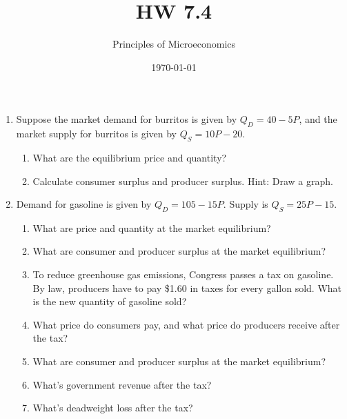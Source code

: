 \documentclass{article}
\title{HW 7.4}
\author{Principles of Microeconomics}
\date{\today}
\begin{document}
\maketitle

\begin{enumerate}

\item Suppose the market demand for burritos is given by $Q_D = 40 - 5P$, and the market supply for burritos is given by $Q_S = 10P - 20$.

	\begin{enumerate}
	
	\item What are the equilibrium price and quantity?
	
	\item Calculate consumer surplus and producer surplus. Hint: Draw a graph.
	
	\end{enumerate}
	
\item Demand for gasoline is given by $Q_D = 105 - 15P$. Supply is $Q_S = 25P - 15$. 

	\begin{enumerate}
	
	\item What are price and quantity at the market equilibrium?
	
	\item What are consumer and producer surplus at the market equilibrium?
	
	\item To reduce greenhouse gas emissions, Congress passes a tax on gasoline. By law, producers have to pay \$1.60 in taxes for every gallon sold. What is the new quantity of gasoline sold?
	
	\item What price do consumers pay, and what price do producers receive after the tax?
	
	\item What are consumer and producer surplus at the market equilibrium? 
	
	\item What's government revenue after the tax?
	
	\item What's deadweight loss after the tax? 
	
	\end{enumerate}
	
\end{enumerate}
	
\end{document}
